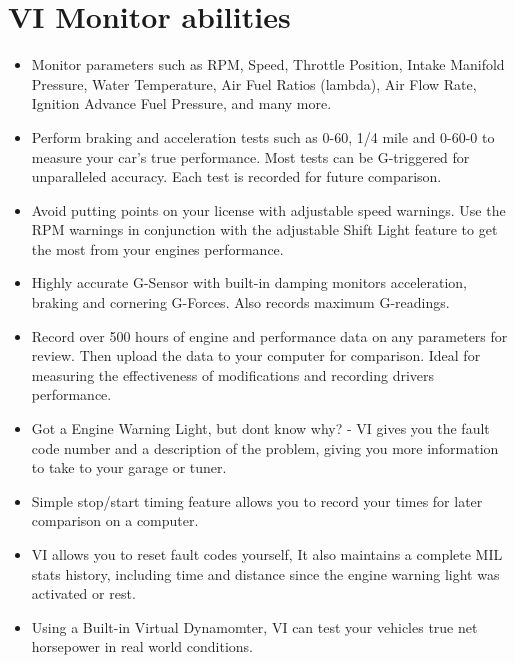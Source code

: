 \chapter{VI Monitor abilities} %
\label{sec:vi_monitor_abilities}
\begin{itemize}
\item Monitor parameters such as RPM, Speed, Throttle Position, Intake Manifold Pressure, Water Temperature,
Air Fuel Ratios (lambda), Air Flow Rate, Ignition Advance Fuel Pressure, and many more.
\item Perform braking and acceleration tests such as 0-60, 1/4 mile and 0-60-0 to measure your car's true 
performance. Most tests can be G-triggered for unparalleled accuracy. Each test is recorded for future comparison.
\item Avoid putting points on your license with adjustable speed warnings. Use the RPM warnings in conjunction with the adjustable Shift Light feature to get the most from your engines performance.
\item Highly accurate G-Sensor with built-in damping monitors acceleration, braking and cornering G-Forces. Also records maximum G-readings.
\item Record over 500 hours of engine and performance data on any parameters for review. Then upload the data to your computer for comparison. Ideal for measuring the effectiveness of modifications and recording drivers performance.
\item Got a Engine Warning Light, but dont know why? - VI gives you the fault code number and a description of the problem, giving you more information to take to your garage or tuner.
\item Simple stop/start timing feature allows you to record your times for later comparison on a computer.
\item VI allows you to reset fault codes yourself, It also maintains a complete MIL stats history, including time and distance since the engine warning light was activated or rest.
\item Using a Built-in Virtual Dynamomter, VI can test your vehicles true net horsepower in real world conditions.
\end{itemize}
